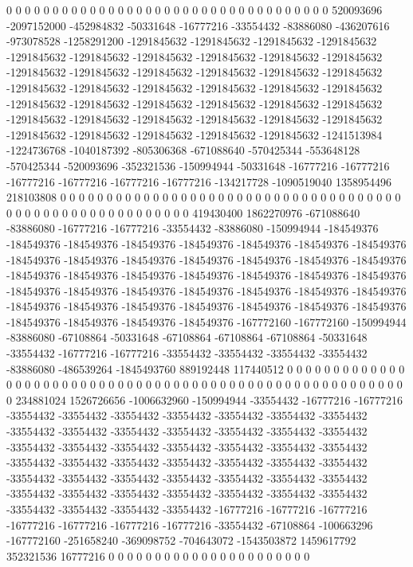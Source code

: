 0 0 0 0 0 0 0 0 0 0 0 0 0 0 0 0 0 0 0 0 0 0 0 0 0 0 0 0 0 0 0 0 0 0 0 520093696 -2097152000 -452984832 -50331648 -16777216 -33554432 -83886080 -436207616 -973078528 -1258291200 -1291845632 -1291845632 -1291845632 -1291845632 -1291845632 -1291845632 -1291845632 -1291845632 -1291845632 -1291845632 -1291845632 -1291845632 -1291845632 -1291845632 -1291845632 -1291845632 -1291845632 -1291845632 -1291845632 -1291845632 -1291845632 -1291845632 -1291845632 -1291845632 -1291845632 -1291845632 -1291845632 -1291845632 -1291845632 -1291845632 -1291845632 -1291845632 -1291845632 -1291845632 -1291845632 -1291845632 -1291845632 -1291845632 -1291845632 -1241513984 -1224736768 -1040187392 -805306368 -671088640 -570425344 -553648128 -570425344 -520093696 -352321536 -150994944 -50331648 -16777216 -16777216 -16777216 -16777216 -16777216 -16777216 -134217728 -1090519040 1358954496 218103808 0 0 0 0 0 0 0 0 0 0 0 0 0 0 0 0 0 0 0 0 0 0
0 0 0 0 0 0 0 0 0 0 0 0 0 0 0 0 0 0 0 0 0 0 0 0 0 0 0 0 0 0 0 0 0 0 0 419430400 1862270976 -671088640 -83886080 -16777216 -16777216 -33554432 -83886080 -150994944 -184549376 -184549376 -184549376 -184549376 -184549376 -184549376 -184549376 -184549376 -184549376 -184549376 -184549376 -184549376 -184549376 -184549376 -184549376 -184549376 -184549376 -184549376 -184549376 -184549376 -184549376 -184549376 -184549376 -184549376 -184549376 -184549376 -184549376 -184549376 -184549376 -184549376 -184549376 -184549376 -184549376 -184549376 -184549376 -184549376 -184549376 -184549376 -184549376 -184549376 -167772160 -167772160 -150994944 -83886080 -67108864 -50331648 -67108864 -67108864 -67108864 -50331648 -33554432 -16777216 -16777216 -33554432 -33554432 -33554432 -33554432 -83886080 -486539264 -1845493760 889192448 117440512 0 0 0 0 0 0 0 0 0 0 0 0 0 0 0 0 0 0 0 0 0 0
0 0 0 0 0 0 0 0 0 0 0 0 0 0 0 0 0 0 0 0 0 0 0 0 0 0 0 0 0 0 0 0 0 0 0 234881024 1526726656 -1006632960 -150994944 -33554432 -16777216 -16777216 -33554432 -33554432 -33554432 -33554432 -33554432 -33554432 -33554432 -33554432 -33554432 -33554432 -33554432 -33554432 -33554432 -33554432 -33554432 -33554432 -33554432 -33554432 -33554432 -33554432 -33554432 -33554432 -33554432 -33554432 -33554432 -33554432 -33554432 -33554432 -33554432 -33554432 -33554432 -33554432 -33554432 -33554432 -33554432 -33554432 -33554432 -33554432 -33554432 -33554432 -33554432 -33554432 -33554432 -33554432 -33554432 -33554432 -16777216 -16777216 -16777216 -16777216 -16777216 -16777216 -16777216 -33554432 -67108864 -100663296 -167772160 -251658240 -369098752 -704643072 -1543503872 1459617792 352321536 16777216 0 0 0 0 0 0 0 0 0 0 0 0 0 0 0 0 0 0 0 0 0 0
